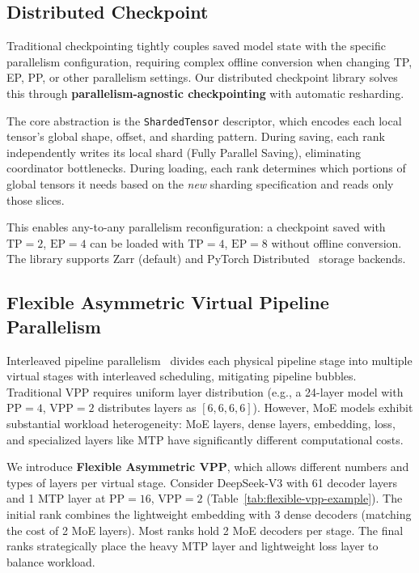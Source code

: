 \subsection{Distributed Checkpoint}

Traditional checkpointing tightly couples saved model state with the specific parallelism configuration, requiring complex offline conversion when changing TP, EP, PP, or other parallelism settings. Our distributed checkpoint library solves this through \textbf{parallelism-agnostic checkpointing} with automatic resharding.

The core abstraction is the \texttt{ShardedTensor} descriptor, which encodes each local tensor's global shape, offset, and sharding pattern. During saving, each rank independently writes its local shard (Fully Parallel Saving), eliminating coordinator bottlenecks. During loading, each rank determines which portions of global tensors it needs based on the \textit{new} sharding specification and reads only those slices.

This enables any-to-any parallelism reconfiguration: a checkpoint saved with $\text{TP}=2$, $\text{EP}=4$ can be loaded with $\text{TP}=4$, $\text{EP}=8$ without offline conversion. The library supports Zarr (default) and PyTorch Distributed~\cite{zhao2023pytorchfsdp} storage backends.

\subsection{Flexible Asymmetric Virtual Pipeline Parallelism}\label{sec:flexible-vpp}

Interleaved pipeline parallelism~\cite{narayanan2021efficient} divides each physical pipeline stage into multiple virtual stages with interleaved scheduling, mitigating pipeline bubbles. Traditional VPP requires uniform layer distribution (e.g., a 24-layer model with $\text{PP}=4$, $\text{VPP}=2$ distributes layers as $[6, 6, 6, 6]$). However, MoE models exhibit substantial workload heterogeneity: MoE layers, dense layers, embedding, loss, and specialized layers like MTP have significantly different computational costs.

We introduce \textbf{Flexible Asymmetric VPP}, which allows different numbers and types of layers per virtual stage. Consider DeepSeek-V3 with 61 decoder layers and 1 MTP layer at $\text{PP}=16$, $\text{VPP}=2$ (Table~\ref{tab:flexible-vpp-example}). The initial rank combines the lightweight embedding with 3 dense decoders (matching the cost of 2 MoE layers). Most ranks hold 2 MoE decoders per stage. The final ranks strategically place the heavy MTP layer and lightweight loss layer to balance workload.

